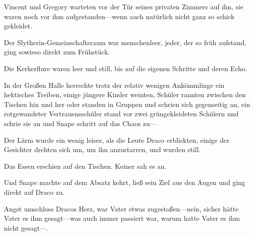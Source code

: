 Vincent und Gregory warteten vor der Tür seines privaten Zimmers auf ihn, sie waren noch vor ihm aufgestanden—wenn auch natürlich nicht ganz so schick gekleidet.

Der Slytherin-Gemeinschaftsraum war menschenleer, jeder, der so früh aufstand, ging sowieso direkt zum Frühstück.

Die Kerkerflure waren leer und still, bis auf die eigenen Schritte und deren Echo.

In der Großen Halle herrschte trotz der relativ wenigen Ankömmlinge ein hektisches Treiben, einige jüngere Kinder weinten, Schüler rannten zwischen den Tischen hin und her oder standen in Gruppen und schrien sich gegenseitig an, ein rotgewandeter Vertrauensschüler stand vor zwei grüngekleideten Schülern und schrie sie an und Snape schritt auf das Chaos zu—

Der Lärm wurde ein wenig leiser, als die Leute Draco erblickten, einige der Gesichter drehten sich um, um ihn anzustarren, und wurden still.

Das Essen erschien auf den Tischen. Keiner sah es an.

Und Snape machte auf dem Absatz kehrt, ließ sein Ziel aus den Augen und ging direkt auf Draco zu.

Angst umschloss Dracos Herz, war Vater etwas zugestoßen—nein, sicher hätte Vater es ihm gesagt—was auch immer passiert war, warum hatte Vater es ihm nicht gesagt—.

